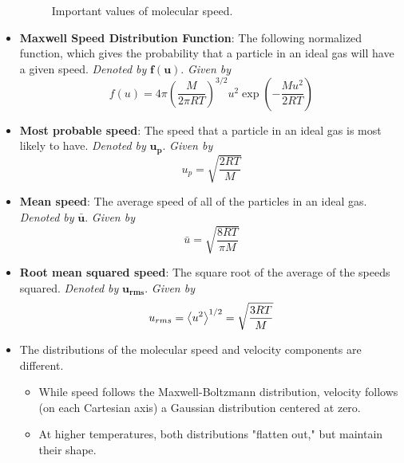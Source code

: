 \documentclass[../notes.tex]{subfiles}
\begin{document}
\begin{itemize}
\begin{figure}[h!]
        \caption{Important values of molecular speed.}
        \label{fig:molecularSpeed}
    \end{figure}
    \item \textbf{Maxwell Speed Distribution Function}: The following normalized function, which gives the probability that a particle in an ideal gas will have a given speed. \emph{Denoted by} $\bm{f(u)}$. \emph{Given by}
    \begin{equation*}
        f(u) = 4\pi\left( \frac{M}{2\pi RT} \right)^{3/2}u^2\exp\left( -\frac{Mu^2}{2RT} \right)
    \end{equation*}
    \item \textbf{Most probable speed}: The speed that a particle in an ideal gas is most likely to have. \emph{Denoted by} $\bm{u_p}$. \emph{Given by}
    \begin{equation*}
        u_p = \sqrt{\frac{2RT}{M}}
    \end{equation*}
    \item \textbf{Mean speed}: The average speed of all of the particles in an ideal gas. \emph{Denoted by} $\bm{\bar{u}}$. \emph{Given by}
    \begin{equation*}
        \bar{u} = \sqrt{\frac{8RT}{\pi M}}
    \end{equation*}
    \item \textbf{Root mean squared speed}: The square root of the average of the speeds squared. \emph{Denoted by} $\bm{u_{rms}}$. \emph{Given by}
    \begin{equation*}
        u_{rms} = \left\langle{u^2}\right\rangle^{1/2}
        = \sqrt{\frac{3RT}{M}}
    \end{equation*}
    \item The distributions of the molecular speed and velocity components are different.
    \begin{itemize}
        \item While speed follows the Maxwell-Boltzmann distribution, velocity follows (on each Cartesian axis) a Gaussian distribution centered at zero.
        \item At higher temperatures, both distributions "flatten out," but maintain their shape.
    \end{itemize}

\end{itemize}
\end{document}
